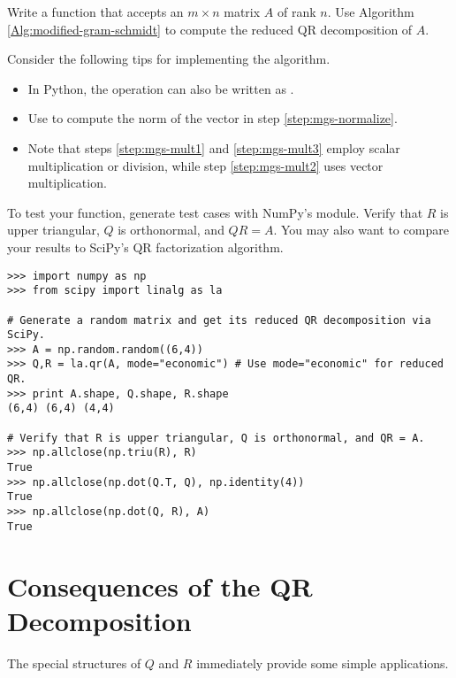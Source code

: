 \begin{problem} %
Write a function that accepts an $m \times n$ matrix $A$ of rank $n$.
Use Algorithm \ref{Alg:modified-gram-schmidt} to compute the reduced QR decomposition of $A$.

Consider the following tips for implementing the algorithm.
\begin{itemize}

\item In Python, the operation  can also be written as .

\item Use  to compute the norm of the vector in step \ref{step:mgs-normalize}.

\item Note that steps \ref{step:mgs-mult1} and \ref{step:mgs-mult3} employ scalar multiplication or division, while step \ref{step:mgs-mult2} uses vector multiplication.

\end{itemize}

To test your function, generate test cases with NumPy's  module.
Verify that $R$ is upper triangular, $Q$ is orthonormal, and $QR = A$.
You may also want to compare your results to SciPy's QR factorization algorithm.

\begin{lstlisting}
>>> import numpy as np
>>> from scipy import linalg as la

# Generate a random matrix and get its reduced QR decomposition via SciPy.
>>> A = np.random.random((6,4))
>>> Q,R = la.qr(A, mode="economic") # Use mode="economic" for reduced QR.
>>> print A.shape, Q.shape, R.shape
(6,4) (6,4) (4,4)

# Verify that R is upper triangular, Q is orthonormal, and QR = A.
>>> np.allclose(np.triu(R), R)
True
>>> np.allclose(np.dot(Q.T, Q), np.identity(4))
True
>>> np.allclose(np.dot(Q, R), A)
True
\end{lstlisting}
\label{prob:qr-via-mgs}
\end{problem}

\newpage

\section*{Consequences of the QR Decomposition} %

The special structures of $Q$ and $R$ immediately provide some simple applications.

